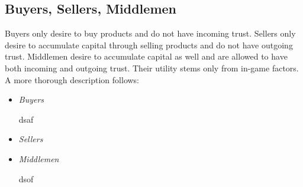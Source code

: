 \subsection{Buyers, Sellers, Middlemen}
  Buyers only desire to buy products and do not have incoming trust. Sellers only desire to accumulate capital through selling
  products and do not have outgoing trust. Middlemen desire to accumulate capital as well and are allowed to have both
  incoming and outgoing trust. Their utility stems only from in-game factors. A more thorough description follows:

  \begin{itemize}
    \item \textit{Buyers}

    dsaf
    
    \item \textit{Sellers}

    \item \textit{Middlemen}

    dsof
  \end{itemize}
